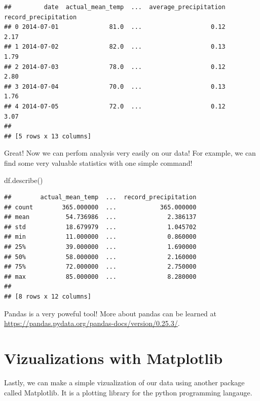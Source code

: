 \documentclass[]{book}
\newenvironment{Shaded}{\begin{snugshade}}{\end{snugshade}}
\newcommand{\NormalTok}[1]{#1}
\begin{document}
\begin{verbatim}
##         date  actual_mean_temp  ...  average_precipitation  record_precipitation
## 0 2014-07-01              81.0  ...                   0.12                  2.17
## 1 2014-07-02              82.0  ...                   0.13                  1.79
## 2 2014-07-03              78.0  ...                   0.12                  2.80
## 3 2014-07-04              70.0  ...                   0.13                  1.76
## 4 2014-07-05              72.0  ...                   0.12                  3.07
## 
## [5 rows x 13 columns]
\end{verbatim}

Great! Now we can perfom analysis very easily on our data! For example,
we can find some very valuable statistics with one simple command!

\begin{Shaded}
\begin{Highlighting}[]
\NormalTok{df.describe()}
\end{Highlighting}
\end{Shaded}

\begin{verbatim}
##        actual_mean_temp  ...  record_precipitation
## count        365.000000  ...            365.000000
## mean          54.736986  ...              2.386137
## std           18.679979  ...              1.045702
## min           11.000000  ...              0.860000
## 25%           39.000000  ...              1.690000
## 50%           58.000000  ...              2.160000
## 75%           72.000000  ...              2.750000
## max           85.000000  ...              8.280000
## 
## [8 rows x 12 columns]
\end{verbatim}

Pandas is a very poweful tool! More about pandas can be learned at
\url{https://pandas.pydata.org/pandas-docs/version/0.25.3/}.

\section{Vizualizations with
Matplotlib}\label{vizualizations-with-matplotlib}

Lastly, we can make a simple vizualization of our data using another
package called Matplotlib. It is a plotting library for the python
programming langauge.
\end{document}
